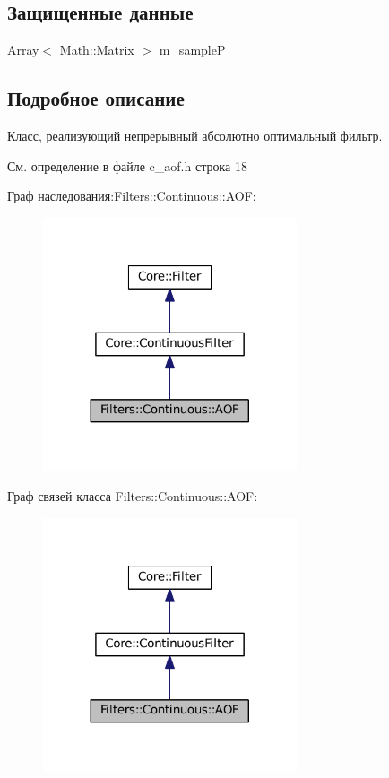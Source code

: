 \subsection*{Защищенные данные}
\begin{DoxyCompactItemize}
\item 
Array$<$ Math\+::\+Matrix $>$ \hyperlink{class_filters_1_1_continuous_1_1_a_o_f_a3cff90f7e12e677f04102f1717ef7a49}{m\+\_\+sampleP}
\end{DoxyCompactItemize}


\subsection{Подробное описание}
Класс, реализующий непрерывный абсолютно оптимальный фильтр. 

См. определение в файле c\+\_\+aof.\+h строка 18



Граф наследования\+:Filters\+:\+:Continuous\+:\+:A\+OF\+:\nopagebreak
\begin{figure}[H]
\begin{center}
\leavevmode
\includegraphics[width=212pt]{class_filters_1_1_continuous_1_1_a_o_f__inherit__graph}
\end{center}
\end{figure}


Граф связей класса Filters\+:\+:Continuous\+:\+:A\+OF\+:\nopagebreak
\begin{figure}[H]
\begin{center}
\leavevmode
\includegraphics[width=212pt]{class_filters_1_1_continuous_1_1_a_o_f__coll__graph}
\end{center}
\end{figure}


